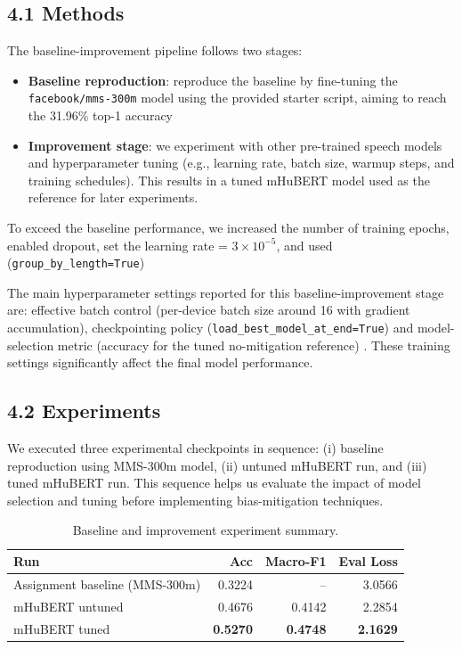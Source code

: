 \documentclass[11pt]{article}
\begin{document}
\subsection*{4.1 Methods}
The baseline-improvement pipeline follows two stages:
\begin{itemize}
    \item \textbf{Baseline reproduction}: reproduce the baseline by fine-tuning the \texttt{facebook/mms-300m} model using the provided starter script, aiming to reach the 31.96\% top-1 accuracy
    
    \item \textbf{Improvement stage}: we experiment with other pre-trained speech models and hyperparameter tuning (e.g., learning rate, batch size, warmup steps, and training schedules). This results in a tuned mHuBERT model used as the reference for later experiments.
\end{itemize}

To exceed the baseline performance, we increased the number of training epochs, enabled dropout, set the learning rate =  \(3\times10^{-5}\), and used (\texttt{group\_by\_length=True})

The main hyperparameter settings reported for this baseline-improvement stage are: effective batch control (per-device batch size around 16 with gradient accumulation), checkpointing policy (\texttt{load\_best\_model\_at\_end=True}) and model-selection metric (accuracy for the tuned no-mitigation reference) .
These training settings significantly affect the final model performance.

\subsection*{4.2 Experiments}
We executed three experimental checkpoints in sequence: (i) baseline reproduction using MMS-300m model, (ii) untuned mHuBERT run, and (iii) tuned mHuBERT run. 
This sequence helps us evaluate the impact of model selection and tuning before implementing bias-mitigation techniques.

\begin{table}[h]
\centering
\small
\setlength{\tabcolsep}{4pt}
\begin{tabular}{@{}p{}rrr@{}}
\toprule
Run & Acc & Macro-F1 & Eval Loss \\
\midrule
Assignment baseline (MMS-300m) & 0.3224 & -- & 3.0566 \\
mHuBERT untuned & 0.4676 & 0.4142 & 2.2854 \\
mHuBERT tuned & \textbf{0.5270} & \textbf{0.4748} & \textbf{2.1629} \\
\bottomrule
\end{tabular}
\caption{Baseline and improvement experiment summary.}
\label{tab:task1_summary}
\end{table}
\FloatBarrier
\end{document}
